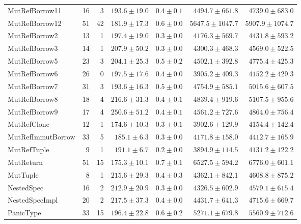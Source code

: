 \begin{table}
\begin{tabular}{lrrrrrr}
MutRefBorrow11           &   16 &    3 &     $193.6\pm19.0$ &  $0.4\pm0.1$ &   $4494.7\pm661.8$ &   $4739.0\pm683.0$ \\
MutRefBorrow12           &   51 &   42 &     $181.9\pm17.3$ &  $0.6\pm0.0$ &  $5647.5\pm1047.7$ &  $5907.9\pm1074.7$ \\
MutRefBorrow2            &   13 &    1 &     $197.4\pm19.0$ &  $0.3\pm0.0$ &   $4176.3\pm569.7$ &   $4431.8\pm593.2$ \\
MutRefBorrow3            &   14 &    1 &     $207.9\pm50.2$ &  $0.3\pm0.0$ &   $4300.3\pm468.3$ &   $4569.0\pm522.5$ \\
MutRefBorrow5            &   23 &    3 &     $204.1\pm25.3$ &  $0.5\pm0.2$ &   $4502.1\pm392.8$ &   $4775.4\pm425.3$ \\
MutRefBorrow6            &   26 &    0 &     $197.5\pm17.6$ &  $0.4\pm0.0$ &   $3905.2\pm409.3$ &   $4152.2\pm429.3$ \\
MutRefBorrow7            &   31 &    3 &     $193.6\pm16.3$ &  $0.5\pm0.0$ &   $4754.9\pm585.1$ &   $5015.6\pm607.5$ \\
MutRefBorrow8            &   18 &    4 &     $216.6\pm31.3$ &  $0.4\pm0.1$ &   $4839.4\pm919.6$ &   $5107.5\pm955.6$ \\
MutRefBorrow9            &   17 &    4 &     $250.6\pm51.2$ &  $0.4\pm0.1$ &   $4561.2\pm727.6$ &   $4864.0\pm756.4$ \\
MutRefClone              &   12 &    1 &     $174.6\pm10.3$ &  $0.3\pm0.1$ &   $3902.6\pm129.9$ &   $4154.4\pm142.4$ \\
MutRefImmutBorrow        &   33 &    5 &      $185.1\pm6.3$ &  $0.3\pm0.0$ &   $4171.8\pm158.0$ &   $4412.7\pm165.9$ \\
MutRefTuple              &    9 &    1 &      $191.1\pm6.7$ &  $0.2\pm0.0$ &   $3894.9\pm114.5$ &   $4131.2\pm122.2$ \\
MutReturn                &   51 &   15 &     $175.3\pm10.1$ &  $0.7\pm0.1$ &   $6527.5\pm594.2$ &   $6776.0\pm601.1$ \\
MutTuple                 &    8 &    1 &     $215.6\pm29.3$ &  $0.4\pm0.3$ &   $4362.1\pm842.1$ &   $4608.8\pm875.2$ \\
NestedSpec               &   16 &    2 &     $212.9\pm20.9$ &  $0.3\pm0.0$ &   $4326.5\pm602.9$ &   $4579.1\pm615.4$ \\
NestedSpecImpl           &   20 &    2 &     $217.5\pm37.3$ &  $0.4\pm0.0$ &   $4431.7\pm641.3$ &   $4715.6\pm669.7$ \\
PanicType                &   33 &   15 &     $196.4\pm22.8$ &  $0.6\pm0.2$ &   $5271.1\pm679.8$ &   $5560.9\pm712.6$ \\

\end{tabular}
\end{table}
